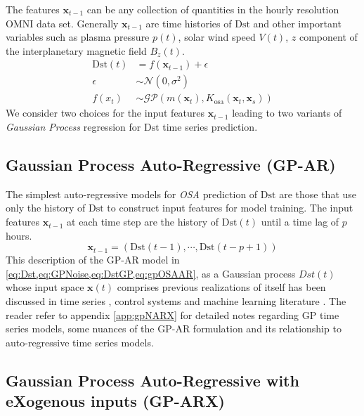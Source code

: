 The features $ \mathbf{x}_{t-1}$ can be any collection of quantities in the hourly resolution OMNI 
data set. Generally $\mathbf{x}_{t-1}$ are time histories of $\mathrm{Dst}$ and other important 
variables such as plasma pressure $p(t)$, solar wind speed $V(t)$, $z$ component of the 
interplanetary magnetic field $B_z(t)$.
%
\begin{align}
    \mathrm{Dst}(t) & =  f(\mathbf{x}_{t-1}) + \epsilon \label{eq:Dst} \\
    \epsilon & \sim  \mathcal{N}(0, \sigma^2) \label{eq:GPNoise} \\
    f(x_t) & \sim  \mathcal{GP}(m(\mathbf{x}_t), K_{\text{osa}}(\mathbf{x}_t, \mathbf{x}_s)) \label{eq:DstGP}
\end{align}
%
We consider two choices for the input features $ \mathbf{x}_{t-1}$ leading to two variants of 
\emph{Gaussian Process} regression for $\mathrm{Dst}$ time series prediction.

\subsection{Gaussian Process Auto-Regressive (GP-AR)} \label{sec:gpar}

The simplest auto-regressive models for \emph{OSA} prediction of $\mathrm{Dst}$ are those that use 
only the history of $\mathrm{Dst}$ to construct input features for model training. The input 
features $\mathbf{x}_{t-1}$ at each time step are the history of $\mathrm{Dst}(t)$ until a time 
lag of $p$ hours.
%
\begin{equation}\label{eq:gpOSAAR}
    \mathbf{x}_{t-1} = \left(\mathrm{Dst}(t-1), \cdots , \mathrm{Dst}(t-p+1)\right)
\end{equation}
%
This description of the GP-AR model in \cref{eq:Dst,eq:GPNoise,eq:DstGP,eq:gpOSAAR}, as a Gaussian 
process $Dst(t)$ whose input space $\mathbf{x}(t)$ comprises previous realizations of itself has 
been discussed in time series \citep{roberts2013gaussian}, control systems 
\citep{kocijan2015modelling} and machine learning literature 
\citep{wang2006gaussian,wang2007gaussian}. The reader refer to appendix \ref{app:gpNARX} for 
detailed notes regarding GP time series models, some nuances of the GP-AR formulation and its 
relationship to auto-regressive time series models. 

\subsection{Gaussian Process Auto-Regressive with eXogenous inputs (GP-ARX)} \label{sec:gparx}

